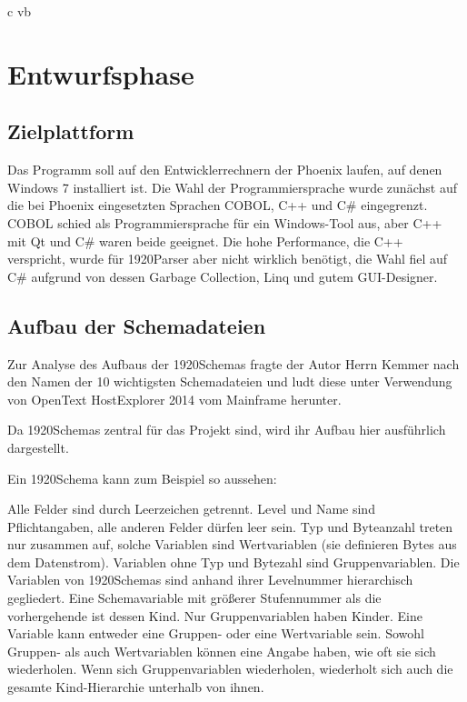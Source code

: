 c vb%
\section{Entwurfsphase} 
\label{sec:Entwurfsphase}

\subsection{Zielplattform}
\label{sec:Zielplattform}
Das Programm soll auf den Entwicklerrechnern der Phoenix laufen, auf denen  Windows 7 installiert ist.
Die Wahl der Programmiersprache wurde zunächst auf die bei Phoenix eingesetzten Sprachen COBOL, C++ und C\# eingegrenzt. COBOL schied als Programmiersprache für ein Windows-Tool aus,  aber C++ mit Qt und C\# waren beide geeignet. Die hohe Performance, die C++ verspricht, wurde für 1920Parser aber nicht wirklich benötigt, die Wahl fiel auf C\# aufgrund von dessen Garbage Collection, Linq und gutem GUI-Designer.

\subsection{Aufbau der Schemadateien}
\label{sec:AufbauSchemas}
Zur Analyse des Aufbaus der 1920Schemas fragte der Autor Herrn Kemmer nach den Namen der 10 wichtigsten Schemadateien und ludt diese unter Verwendung von OpenText HostExplorer 2014 vom Mainframe herunter.

Da 1920Schemas zentral für das Projekt sind, wird ihr Aufbau hier ausführlich dargestellt.

 Ein 1920Schema kann zum Beispiel so aussehen:



Alle Felder sind durch Leerzeichen getrennt. Level und Name sind Pflichtangaben, alle anderen Felder dürfen leer sein. Typ und Byteanzahl treten nur zusammen auf, solche Variablen sind Wertvariablen (sie definieren Bytes aus dem Datenstrom). Variablen ohne Typ und Bytezahl sind Gruppenvariablen.
Die Variablen von 1920Schemas sind anhand ihrer Levelnummer hierarchisch gegliedert. Eine Schemavariable mit größerer Stufennummer als die vorhergehende ist dessen Kind. Nur Gruppenvariablen haben Kinder.
Eine Variable kann entweder eine Gruppen- oder eine Wertvariable sein.
Sowohl Gruppen- als auch Wertvariablen können eine Angabe haben, wie oft sie sich wiederholen. Wenn sich Gruppenvariablen wiederholen, wiederholt sich auch die gesamte Kind-Hierarchie unterhalb von ihnen.

